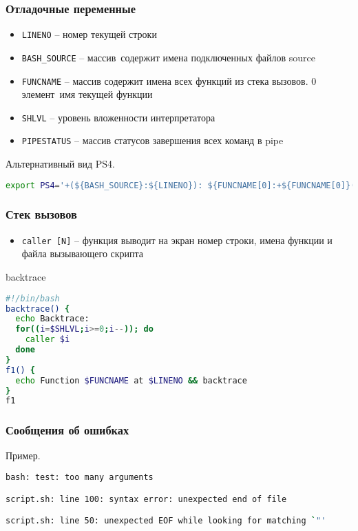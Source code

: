 \begin{frame}[fragile]
	\frametitle{Отладочные переменные}

	\begin{itemize}
		\item {\tt LINENO} -- номер текущей строки
		\item {\tt BASH\_SOURCE} -- массив\, содержит имена подключенных файлов source 
		\item {\tt FUNCNAME} -- массив содержит имена всех функций из стека вызовов. 0 элемент\, имя текущей функции 
		\item {\tt SHLVL} -- уровень вложенности интерпретатора
		\item {\tt PIPESTATUS} -- массив статусов завершения всех команд в pipe
	\end{itemize}

	\begin{block}{Альтернативный вид PS4.}
		\begin{lstlisting}[language=sh]
export PS4='+(${BASH_SOURCE}:${LINENO}): ${FUNCNAME[0]:+${FUNCNAME[0]}(): }'
		\end{lstlisting}
	\end{block}
\end{frame}

\begin{frame}[fragile]
	\frametitle{Стек вызовов}

	\begin{itemize}
		\item {\tt caller [N]} -- функция выводит на экран номер строки, имена функции и файла вызывающего скрипта
	\end{itemize}

	\begin{block}{backtrace}
		\begin{lstlisting}[language=sh]
#!/bin/bash
backtrace() {
  echo Backtrace:
  for((i=$SHLVL;i>=0;i--)); do
    caller $i
  done
}
f1() {
  echo Function $FUNCNAME at $LINENO && backtrace
}
f1
		\end{lstlisting}
	\end{block}

\end{frame}

\begin{frame}[fragile]
	\frametitle{Сообщения об ошибках}

	\begin{block}{Пример.}
		\begin{lstlisting}[language=sh]
bash: test: too many arguments

script.sh: line 100: syntax error: unexpected end of file

script.sh: line 50: unexpected EOF while looking for matching `"' 


		\end{lstlisting}
	\end{block}

\end{frame}
%
